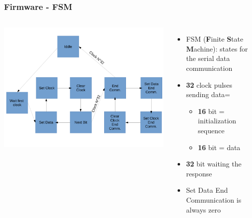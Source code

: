 \documentclass[aspectratio=169]{beamer}
\begin{document}
	\begin{frame}[fragile]
		\frametitle{Firmware - FSM}
		\begin{columns}
			\begin{center}
				\includegraphics[width=0.95 \textwidth]{IMG/FSM.pdf}
			\end{center}
			\begin{itemize}
				\item FSM (\textbf{F}inite \textbf{S}tate \textbf{M}achine): states for the serial data communication
				\item \textbf{32} clock pulses sending data=
				\begin{itemize}
					\item \textbf{16} bit = initialization sequence
					\item \textbf{16} bit = data
				\end{itemize}
				\item \textbf{32} bit waiting the response
				\item Set Data End Communication is always zero
			\end{itemize}
		\end{columns}
	\end{frame}
\end{document}
